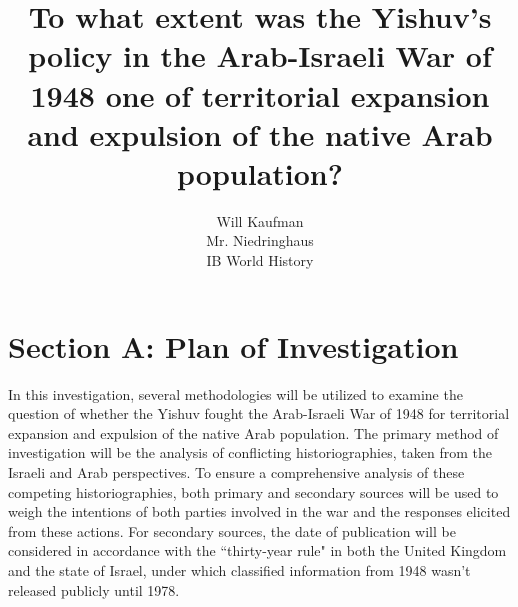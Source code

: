 \documentclass[11pt]{turabian-researchpaper}
\begin{document}
\title{To what extent was the Yishuv's policy in the Arab-Israeli War of 1948 one of territorial expansion and expulsion of the native Arab population?}

\author{Will Kaufman \\ Mr. Niedringhaus \\ IB World History}
\maketitle



\section{Section A: Plan of Investigation}
In this investigation, several methodologies will be utilized to examine the question of whether the Yishuv fought the Arab-Israeli War of 1948 for territorial expansion and expulsion of the native Arab population.  The primary method of investigation will be the analysis of conflicting historiographies, taken from the Israeli and Arab perspectives.  To ensure a comprehensive analysis of these competing historiographies, both primary and secondary sources will be used to weigh the intentions of both parties involved in the war and the responses elicited from these actions.  For secondary sources, the date of publication will be considered in accordance with the ``thirty-year rule" in both the United Kingdom and the state of Israel, under which classified information from 1948 wasn’t released publicly until 1978.

\end{document}
